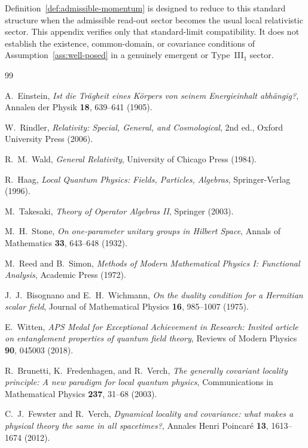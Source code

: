 \documentclass[12pt,a4paper]{article}
\theoremstyle{definition}
\theoremstyle{remark}
\begin{document}
Definition~\ref{def:admissible-momentum} is designed to reduce to this standard structure when the admissible read-out sector becomes the usual local relativistic sector.
This appendix verifies only that standard-limit compatibility.  It does not establish the existence, common-domain, or covariance conditions of Assumption~\ref{ass:well-posed} in a genuinely emergent or Type~III$_1$ sector.

\begin{thebibliography}{99}

A.~Einstein, \emph{Ist die Tr\"agheit eines K\"orpers von seinem Energieinhalt abh\"angig?}, Annalen der Physik \textbf{18}, 639--641 (1905).

W.~Rindler, \emph{Relativity: Special, General, and Cosmological}, 2nd ed., Oxford University Press (2006).

R.~M.~Wald, \emph{General Relativity}, University of Chicago Press (1984).

R.~Haag, \emph{Local Quantum Physics: Fields, Particles, Algebras}, Springer-Verlag (1996).

M.~Takesaki, \emph{Theory of Operator Algebras II}, Springer (2003).

M.~H.~Stone, \emph{On one-parameter unitary groups in Hilbert Space}, Annals of Mathematics \textbf{33}, 643--648 (1932).

M.~Reed and B.~Simon, \emph{Methods of Modern Mathematical Physics I: Functional Analysis}, Academic Press (1972).

J.~J.~Bisognano and E.~H.~Wichmann, \emph{On the duality condition for a Hermitian scalar field}, Journal of Mathematical Physics \textbf{16}, 985--1007 (1975).

E.~Witten, \emph{APS Medal for Exceptional Achievement in Research: Invited article on entanglement properties of quantum field theory}, Reviews of Modern Physics \textbf{90}, 045003 (2018).

R.~Brunetti, K.~Fredenhagen, and R.~Verch, \emph{The generally covariant locality principle: A new paradigm for local quantum physics}, Communications in Mathematical Physics \textbf{237}, 31--68 (2003).

C.~J.~Fewster and R.~Verch, \emph{Dynamical locality and covariance: what makes a physical theory the same in all spacetimes?}, Annales Henri Poincar\'e \textbf{13}, 1613--1674 (2012).


\end{thebibliography}
\end{document}
